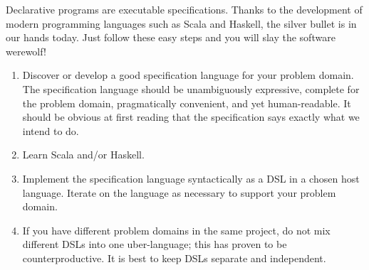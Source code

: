 Declarative programs are executable specifications. Thanks to the
development of modern programming languages such as Scala and Haskell,
the silver bullet is in our hands today. Just follow these easy steps
and you will slay the software werewolf!
\begin{enumerate}
\item Discover or develop a good specification language for your problem
domain. The specification language should be unambiguously expressive,
complete for the problem domain, pragmatically convenient, and yet
human-readable. It should be obvious at first reading that the specification
says exactly what we intend to do.
\item Learn Scala and/or Haskell. 
\item Implement the specification language syntactically as a DSL in a chosen
host language. Iterate on the language as necessary to support your
problem domain. 
\item If you have different problem domains in the same project, do not
mix different DSLs into one uber-language; this has proven to be counterproductive.
It is best to keep DSLs separate and independent.
\end{enumerate}

